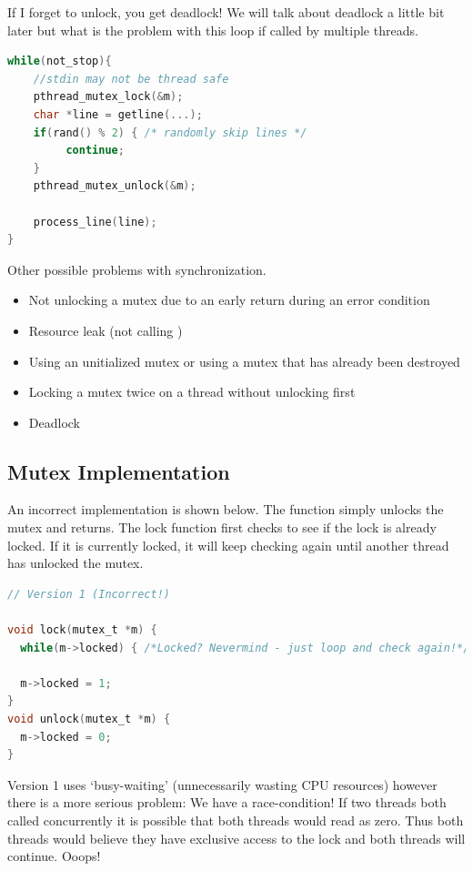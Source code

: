 If I forget to unlock, you get deadlock! We will talk about deadlock a little bit later but what is the problem with this loop if called by multiple threads.

\begin{lstlisting}[language=C]
while(not_stop){
    //stdin may not be thread safe
    pthread_mutex_lock(&m);
    char *line = getline(...);
    if(rand() % 2) { /* randomly skip lines */
         continue;
    }
    pthread_mutex_unlock(&m);
    
    process_line(line);
}
\end{lstlisting}

Other possible problems with synchronization.

\begin{itemize}
\tightlist
\item
  Not unlocking a mutex due to an early return during an error condition
\item
  Resource leak (not calling )
\item
  Using an unitialized mutex or using a mutex that has already been destroyed
\item
  Locking a mutex twice on a thread without unlocking first
\item
  Deadlock
\end{itemize}

\subsection{Mutex Implementation}

An incorrect implementation is shown below. The  function simply unlocks the mutex and returns. The lock function first checks to see if the lock is already locked. If it is currently locked, it will keep checking again until another thread has unlocked the mutex.

\begin{lstlisting}[language=C]
// Version 1 (Incorrect!)

void lock(mutex_t *m) {
  while(m->locked) { /*Locked? Nevermind - just loop and check again!*/ }

  m->locked = 1;
}
void unlock(mutex_t *m) {
  m->locked = 0;
}
\end{lstlisting}

Version 1 uses `busy-waiting' (unnecessarily wasting CPU resources) however there is a more serious problem: We have a race-condition! If two threads both called  concurrently it is possible that both threads would read  as zero. Thus both threads would believe they have exclusive access to the lock and both threads will continue. Ooops!

